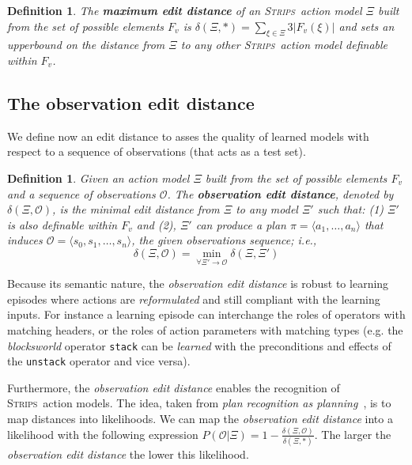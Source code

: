 \documentclass{article}
\newcommand{\tup}[1]{{\langle #1 \rangle}}
\newcommand{\strips}{\textsc{Strips}}     %
\newtheorem{definition}[theorem]{Definition}
\begin{document}
\begin{definition}
The \textbf{maximum edit distance} of an \strips\ action model $\Xi$ built from the set of possible elements $F_v$ is $\delta(\Xi,*)=\sum_{\xi\in\Xi} 3|F_v(\xi)|$ and sets an upperbound on the distance from $\Xi$ to any other \strips\ action model definable within $F_v$.
\end{definition}

\subsection{The observation edit distance}
We define now an edit distance to asses the quality of learned models with respect to a sequence of observations (that acts as a test set). 

\begin{definition}
Given an action model $\Xi$ built from the set of possible elements $F_v$ and a sequence of observations $\mathcal{O}$. The {\bf observation edit distance}, denoted by  $\delta(\Xi,\mathcal{O})$, is the minimal edit distance from $\Xi$ to any model $\Xi'$ such that: (1) $\Xi'$ is also definable within $F_v$ and (2), $\Xi'$ can produce a plan $\pi=\tup{a_1, \ldots, a_n}$ that induces $\mathcal{O}=\tup{s_0, s_1, \ldots, s_n}$, the given observations sequence; i.e., \[\delta(\Xi,\mathcal{O})=\min_{\forall \Xi' \rightarrow \mathcal{O}} \delta(\Xi,\Xi')\]
\end{definition}

Because its semantic nature, the {\em observation edit distance} is robust to learning episodes where actions are {\em reformulated} and still compliant with the learning inputs. For instance a learning episode can interchange the roles of operators with matching headers, or the roles of action parameters with matching types (e.g. the {\em blocksworld} operator {\small\tt stack} can be {\em learned} with the preconditions and effects of the {\small\tt unstack} operator and vice versa).

Furthermore, the {\em observation edit distance} enables the recognition of \strips\ action models. The idea, taken from {\em plan recognition as planning}~\cite{ramirez2009plan}, is to map distances into likelihoods. We can map the {\em observation edit distance} into a likelihood with the following expression $P(\mathcal{O}|\Xi)=1-\frac{\delta(\Xi,\mathcal{O})}{\delta(\Xi,*)}$. The larger the {\em observation edit distance} the lower this likelihood.
\end{document}
